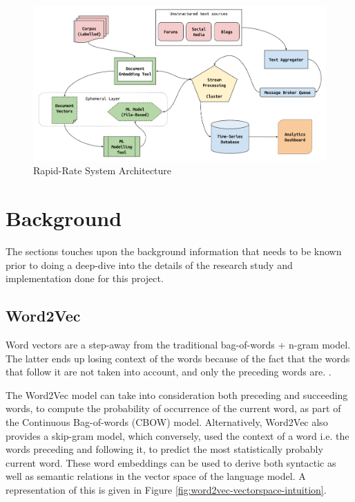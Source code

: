 \documentclass[conference]{IEEEtran}
\begin{document}
\vspace{5mm}

\begin{figure}[ht]
    \centering
    \includegraphics[width=\textwidth]{images/rapid_rate_system_arch_1.png}
    \caption{Rapid-Rate System Architecture}
    \label{fig:system-architecture}
\end{figure}

\section{Background}
    The sections touches upon the background information that needs to be known prior to doing a deep-dive into the details of the research study and implementation done for this project.

    \subsection{Word2Vec} \label{Word2Vec}
        Word vectors are a step-away from the traditional bag-of-words + n-gram model. 
        The latter ends up losing context of the words because of the fact that the words that follow it are not taken into account, and only the preceding words are. .

        The Word2Vec model\cite{mikolov2013efficient} can take into consideration both preceding and succeeding words, to compute the probability of occurrence of the current word, as part of the Continuous Bag-of-words (CBOW) model. 
        Alternatively, Word2Vec also provides a skip-gram model\cite{mikolov2013distributed}, which conversely, used the context of a word i.e. the words preceding and following it, to predict the most statistically probably current word. 
        These word embeddings can be used to derive both syntactic as well as semantic relations in the vector space of the language model. A representation of this is given in Figure \ref{fig:word2vec-vectorspace-intuition}.
\end{document}
